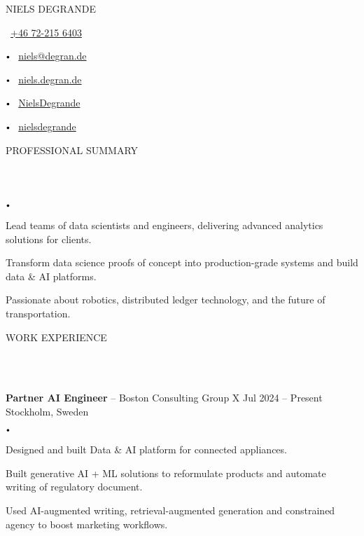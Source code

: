 \documentclass{article}
\newcommand{\contact}[2]{
    \begin{center}
    {\LARGE \uppercase {#1}} \\
    \vspace{8pt}
    #2
    \end{center}
}
\newcommand{\header}[1]{
    {
        \hspace*{-4pt}
        \vspace*{8pt}
        \uppercase{#1}
    }
    \vspace*{-4pt} 
    \lineunder
    \vspace*{8pt}
}
\newcommand{\lineunder}{
    \vspace*{-8pt} \\ 
    \hspace*{-4pt} 
    \hrulefill \\
}
\newcommand{\experience}[5]{
    \vspace*{2pt}
    \textbf{#1} -- #2 \hfill #3 \\ 
    #4 \\
    #5
    \vspace*{2pt}
}
\newcommand{\bigdot}{
    $\vcenter{\hbox{\tiny$\bullet$}}$\hspace*{2pt}
}
\newcommand{\spacedbullet}{
    $\vcenter{\hbox{\tiny$\bullet$}}$\hspace*{-2pt}
}
\newenvironment{bulletlist}{
    \begin{list}
        {\spacedbullet}{\setlength\leftmargin{10pt} 
        \topsep 0pt \itemsep -2pt}}{\vspace*{4pt}
    \end{list}
}
\begin{document}
\small

\vspace*{-32pt}

\contact{Niels Degrande}
{
    \faPhone\ \href{tel:+46722156403}{+46 72-215 6403}
    \bigdot \faEnvelope\ \href{mailto:niels@degran.de}{niels@degran.de}
    \bigdot \faGlobe\ \href{https://niels.degran.de}{niels.degran.de}
    \bigdot \faGithub\ \href{https://github.com/NielsDegrande}{NielsDegrande}
    \bigdot \faLinkedin\ \href{https://linkedin.com/in/nielsdegrande}{nielsdegrande}
}

\vspace{16pt}

\header{Professional Summary}
\begin{bulletlist}
    \item Lead teams of data scientists and engineers, delivering advanced analytics solutions for clients.
    \item Transform data science proofs of concept into production-grade systems and build data \& AI platforms.
    \item Passionate about robotics, distributed ledger technology, and the future of transportation.
\end{bulletlist}

\vspace*{4pt}

\header{Work Experience}
\experience{Partner AI Engineer}{Boston Consulting Group X}{Jul 2024 -- Present}{Stockholm, Sweden}
{
    \begin{bulletlist}
        \item Designed and built Data \& AI platform for connected appliances.
        \item Built generative AI + ML solutions to reformulate products and automate writing of regulatory document.
        \item Used AI-augmented writing, retrieval-augmented generation and constrained agency to boost marketing workflows.
    \end{bulletlist}
}
\end{document}
